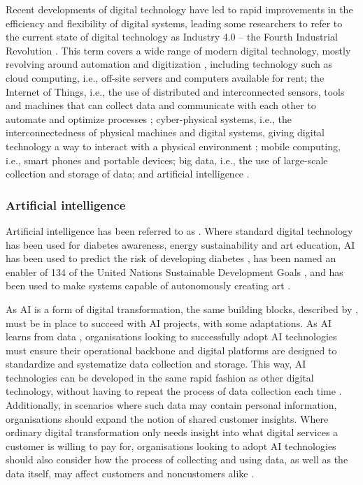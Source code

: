 Recent developments of digital technology have led to rapid improvements in the efficiency and flexibility of digital systems, leading some researchers to refer to the current state of digital technology as Industry 4.0 -- the Fourth Industrial Revolution \parencite{Lasi_2014_AIbackground}. This term covers a wide range of modern digital technology, mostly revolving around automation and digitization \parencite{Lu_2017_AIbackground}, including technology such as cloud computing, i.e., off-site servers and computers available for rent; the Internet of Things, i.e., the use of distributed and interconnected sensors, tools and machines that can collect data and communicate with each other to automate and optimize processes \parencite{Xu_2018_AIbackground}; cyber-physical systems, i.e., the interconnectedness of physical machines and digital systems, giving digital technology a way to interact with a physical environment \parencite{Lasi_2014_AIbackground}; mobile computing, i.e., smart phones and portable devices; big data, i.e., the use of large-scale collection and storage of data; and artificial intelligence \parencite{Lu_2017_AIbackground}.


\subsubsection{Artificial intelligence}
Artificial intelligence has been referred to as  \parencite{Graham_2020_AIbackground}. Where standard digital technology has been used for diabetes awareness, energy sustainability and art education, AI has been used to predict the risk of developing diabetes \parencite{Ellahham_2020_AIbackground}, has been named an enabler of 134 of the United Nations Sustainable Development Goals \parencite{Vinuesa_2020_AIbackground}, and has been used to make systems capable of autonomously creating art \parencite{Cetinic_2022_AIbackground}.

As AI is a form of digital transformation, the same building blocks, described by \textcite{ross_2018_digtech}, must be in place to succeed with AI projects, with some adaptations. As AI learns from data \parencite{Graham_2020_AIbackground}, organisations looking to successfully adopt AI technologies must ensure their operational backbone and digital platforms are designed to standardize and systematize data collection and storage. This way, AI technologies can be developed in the same rapid fashion as other digital technology, without having to repeat the process of data collection each time \parencite{Werder_2022}. Additionally, in scenarios where such data may contain personal information, organisations should expand the notion of shared customer insights. Where ordinary digital transformation only needs insight into what digital services a customer is willing to pay for, organisations looking to adopt AI technologies should also consider how the process of collecting and using data, as well as the data itself, may affect customers and noncustomers alike \parencite{Dignum_2021}.

